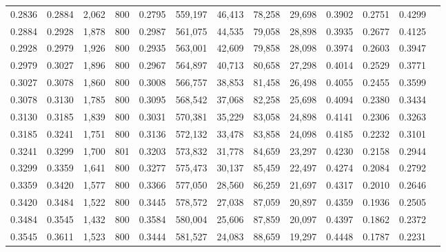 \begin{tabular}{rrrrrrrrrrrrr}
0.2836 & 0.2884 &  2,062 &   800 &                                     0.2795 & 559,197 &  46,413 &  78,258 &  29,698 & 0.3902 & 0.2751 & 0.4299 \\
0.2884 & 0.2928 &  1,878 &   800 &                                     0.2987 & 561,075 &  44,535 &  79,058 &  28,898 & 0.3935 & 0.2677 & 0.4125 \\
0.2928 & 0.2979 &  1,926 &   800 &                                     0.2935 & 563,001 &  42,609 &  79,858 &  28,098 & 0.3974 & 0.2603 & 0.3947 \\
0.2979 & 0.3027 &  1,896 &   800 &                                     0.2967 & 564,897 &  40,713 &  80,658 &  27,298 & 0.4014 & 0.2529 & 0.3771 \\
0.3027 & 0.3078 &  1,860 &   800 &                                     0.3008 & 566,757 &  38,853 &  81,458 &  26,498 & 0.4055 & 0.2455 & 0.3599 \\
0.3078 & 0.3130 &  1,785 &   800 &                                     0.3095 & 568,542 &  37,068 &  82,258 &  25,698 & 0.4094 & 0.2380 & 0.3434 \\
0.3130 & 0.3185 &  1,839 &   800 &                                     0.3031 & 570,381 &  35,229 &  83,058 &  24,898 & 0.4141 & 0.2306 & 0.3263 \\
0.3185 & 0.3241 &  1,751 &   800 &                                     0.3136 & 572,132 &  33,478 &  83,858 &  24,098 & 0.4185 & 0.2232 & 0.3101 \\
0.3241 & 0.3299 &  1,700 &   801 &                                     0.3203 & 573,832 &  31,778 &  84,659 &  23,297 & 0.4230 & 0.2158 & 0.2944 \\
0.3299 & 0.3359 &  1,641 &   800 &                                     0.3277 & 575,473 &  30,137 &  85,459 &  22,497 & 0.4274 & 0.2084 & 0.2792 \\
0.3359 & 0.3420 &  1,577 &   800 &                                     0.3366 & 577,050 &  28,560 &  86,259 &  21,697 & 0.4317 & 0.2010 & 0.2646 \\
0.3420 & 0.3484 &  1,522 &   800 &                                     0.3445 & 578,572 &  27,038 &  87,059 &  20,897 & 0.4359 & 0.1936 & 0.2505 \\
0.3484 & 0.3545 &  1,432 &   800 &                                     0.3584 & 580,004 &  25,606 &  87,859 &  20,097 & 0.4397 & 0.1862 & 0.2372 \\
0.3545 & 0.3611 &  1,523 &   800 &                                     0.3444 & 581,527 &  24,083 &  88,659 &  19,297 & 0.4448 & 0.1787 & 0.2231 \\

\end{tabular}
